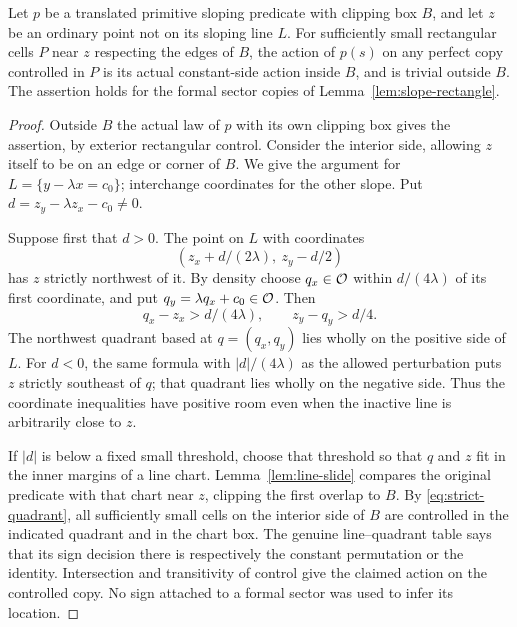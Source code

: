 \begin{lemma}
\label{lem:inactive-line}
Let $p$ be a translated primitive sloping predicate with clipping
box $B$, and let $z$ be an ordinary point not on its sloping
line $L$.  For sufficiently small rectangular cells $P$ near
$z$ respecting the edges of $B$, the action of $p(s)$ on any
perfect copy controlled in $P$ is its actual constant-side
action inside $B$, and is trivial outside $B$.  The assertion
holds for the formal sector copies of
Lemma~\ref{lem:slope-rectangle}.
\end{lemma}

\begin{proof}
Outside $B$ the actual law of $p$ with its own clipping box
gives the assertion, by exterior rectangular control.
Consider the interior side, allowing $z$ itself to be on an
edge or corner of $B$.  We give the argument for
$L=\{y-\lambda x=c_0\}$; interchange coordinates for the
other slope.  Put $d=z_y-\lambda z_x-c_0\ne0$.

Suppose first that $d>0$.  The point on $L$ with coordinates
\[
 (z_x+d/(2\lambda),\ z_y-d/2)
\]
has $z$ strictly northwest of it.  By density choose
$q_x\in\mathcal O$ within $d/(4\lambda)$ of its first coordinate,
and put $q_y=\lambda q_x+c_0\in\mathcal O$.  Then
\begin{equation}\label{eq:strict-quadrant}
 q_x-z_x>d/(4\lambda),\qquad z_y-q_y>d/4.
\end{equation}
The northwest quadrant based at $q=(q_x,q_y)$ lies wholly on
the positive side of $L$.  For $d<0$, the same formula with
$|d|/(4\lambda)$ as the allowed perturbation puts $z$ strictly
southeast of $q$; that quadrant lies wholly on the negative
side.  Thus the coordinate inequalities have positive room
even when the inactive line is arbitrarily close to $z$.

If $|d|$ is below a fixed small threshold, choose that threshold
so that $q$ and $z$ fit in the inner margins of a line chart.
Lemma~\ref{lem:line-slide} compares the original predicate with
that chart near $z$, clipping the first overlap to $B$.
By \eqref{eq:strict-quadrant}, all sufficiently small cells on
the interior side of $B$ are controlled in the indicated
quadrant and in the chart box.  The genuine line--quadrant
table says that its sign decision there is respectively the
constant permutation or the identity.  Intersection and
transitivity of control give the claimed action on the
controlled copy.  No sign attached to a formal sector was
used to infer its location.


\end{proof}
